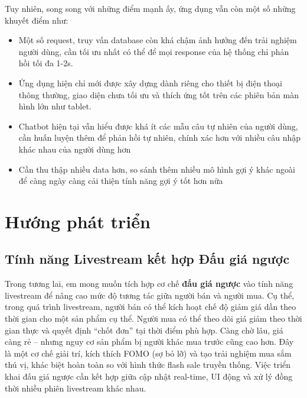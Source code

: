 \documentclass[../DoAn.tex]{subfiles}
\begin{document}
Tuy nhiên, song song với những điểm mạnh ấy, ứng dụng vẫn còn một số những khuyết điểm như:

\begin{itemize}
    \item Một số request, truy vấn database còn khá chậm ảnh hưởng đến trải nghiệm người dùng, cần tối ưu nhất có thể để mọi response của hệ thống chỉ phản hồi tối đa 1-2s.
    \item Ứng dụng hiện chỉ mới được xây dựng dành riêng cho thiết bị điện thoại thông thường, giao diện chưa tối ưu và thích ứng tốt trên các phiên bản màn hình lớn như tablet.
    \item Chatbot hiện tại vẫn hiểu được khá ít các mẫu câu tự nhiên của người dùng, cần huấn luyện thêm để phản hồi tự nhiên, chính xác hơn với nhiều câu nhập khác nhau của người dùng hơn
    \item Cần thu thập nhiều data hơn, so sánh thêm nhiều mô hình gợi ý khác ngoài\cite{LightFM} để càng ngày càng cải thiện tính năng gợi ý tốt hơn nữa
\end{itemize}



\section{Hướng phát triển}

\subsection{Tính năng Livestream kết hợp Đấu giá ngược}
Trong tương lai, em mong muốn tích hợp cơ chế \textbf{đấu giá ngược} vào tính năng livestream để nâng cao mức độ tương tác giữa người bán và người mua. Cụ thể, trong quá trình livestream, người bán có thể kích hoạt chế độ giảm giá dần theo thời gian cho một sản phẩm cụ thể. Người mua có thể theo dõi giá giảm theo thời gian thực và quyết định “chốt đơn” tại thời điểm phù hợp. Càng chờ lâu, giá càng rẻ – nhưng nguy cơ sản phẩm bị người khác mua trước cũng cao hơn. Đây là một cơ chế giải trí, kích thích FOMO (sợ bỏ lỡ) và tạo trải nghiệm mua sắm thú vị, khác biệt hoàn toàn so với hình thức flash sale truyền thống. Việc triển khai đấu giá ngược cần kết hợp giữa cập nhật real-time, UI động và xử lý đồng thời nhiều phiên livestream khác nhau.
\end{document}
